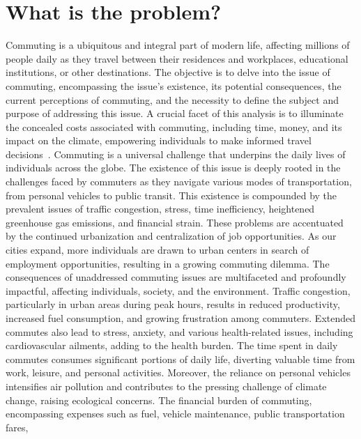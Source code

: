 \section{What is the problem?}\label{sec:what-is-the-problem?}
Commuting is a ubiquitous and integral part of modern life, affecting millions of people daily as they travel between
their residences and workplaces, educational institutions, or other destinations.
The objective is to delve into the issue of commuting, encompassing the issue's existence, its potential consequences,
the current perceptions of commuting, and the necessity to define the subject and purpose of addressing this issue.
A crucial facet of this analysis is to illuminate the concealed costs associated with commuting, including time, money,
and its impact on the climate, empowering individuals to make informed travel decisions~\cite{alma9921355859805762}.
Commuting is a universal challenge that underpins the daily lives of individuals across the globe.
The existence of this issue is deeply rooted in the challenges faced by commuters as they navigate various modes of
transportation, from personal vehicles to public transit.
This existence is compounded by the prevalent issues of traffic congestion, stress, time inefficiency, heightened
greenhouse gas emissions, and financial strain.
These problems are accentuated by the continued urbanization and centralization of job opportunities.
As our cities expand, more individuals are drawn to urban centers in search of employment opportunities, resulting in a
growing commuting dilemma.
The consequences of unaddressed commuting issues are multifaceted and profoundly impactful, affecting individuals,
society, and the environment.
Traffic congestion, particularly in urban areas during peak hours, results in reduced productivity, increased fuel
consumption, and growing frustration among commuters.
Extended commutes also lead to stress, anxiety, and various health-related issues, including cardiovascular ailments,
adding to the health burden.
The time spent in daily commutes consumes significant portions of daily life, diverting valuable time from work,
leisure, and personal activities.
Moreover, the reliance on personal vehicles intensifies air pollution and contributes to the pressing challenge of
climate change, raising ecological concerns.
The financial burden of commuting, encompassing expenses such as fuel, vehicle maintenance, public transportation fares,
